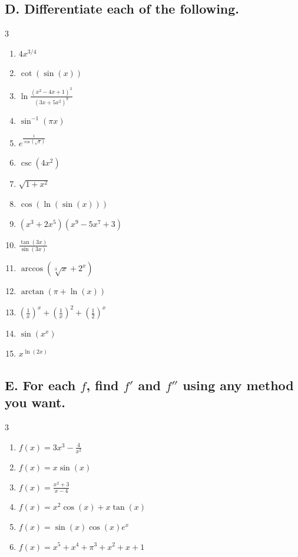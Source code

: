 \documentclass{article}
\begin{document}
\subsection*{D. Differentiate each of the following.}
\begin{multicols}{3}
\begin{enumerate}
\item $4x^{3/4}$
\item $\cot(\sin(x))$
\item $\ln\frac{(x^2-4x+1)^3}{(3x+5x^2)^8}$
\item $\sin^{-1}(\pi x)$
\item $e^{\frac{1}{\cos(\sqrt{x})}}$
\item $\csc(4x^2)$
\item $\sqrt{1+x^2}$
\item $\cos(\ln(\sin(x)))$
\item $(x^3+2x^5)(x^{9}-5x^7+3)$
\item $\frac{\tan(3x)}{\sin(3x)}$
\item $\arccos(\sqrt[3]{x}+2^x)$
\item $\arctan(\pi +\ln(x))$
\item $\left(\frac{1}{x}\right)^x+\left(\frac{1}{x}\right)^2+\left(\frac{1}{2}\right)^x$
\item $\sin(x^x)$
\item $x^{\ln(2x)}$
\end{enumerate}
\end{multicols}

\subsection*{E. For each $f$, find $f'$ and $f''$ using any method you want.}
\begin{multicols}{3}
\begin{enumerate}
\item $f(x)=3x^3-\frac{4}{x^2}$
\item $f(x)=x\sin(x)$
\item $f(x)=\frac{x^2+3}{x-4}$
\item $f(x)=x^2\cos(x)+x\tan(x)$
\item $f(x)=\sin(x)\cos(x)e^x$
\item $f(x)=x^5+x^4+\pi^3+x^2+x+1$
\end{enumerate}
\end{multicols}
\end{document}
